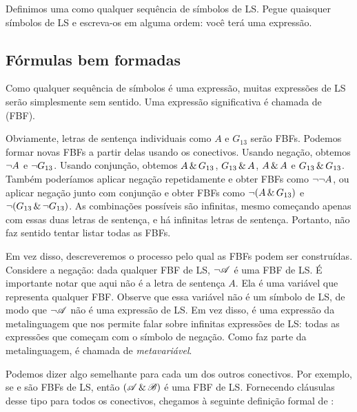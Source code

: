 Definimos uma  como qualquer sequência de símbolos de LS. Pegue quaisquer símbolos de LS e escreva-os em alguma ordem: você terá uma expressão.


\subsection{Fórmulas bem formadas}

Como qualquer sequência de símbolos é uma expressão, muitas expressões de LS serão simplesmente sem sentido. Uma expressão significativa é chamada de  (FBF).

Obviamente, letras de sentença individuais como $A$ e $G_{13}$ serão FBFs. Podemos formar novas FBFs a partir delas usando os conectivos. Usando negação, obtemos $\neg A$ e $\neg G_{13}$. Usando conjunção, obtemos $A \,\&\, G_{13}$, $G_{13} \,\&\, A$, $A \,\&\, A$ e $G_{13} \,\&\, G_{13}$. Também poderíamos aplicar negação repetidamente e obter FBFs como $\neg \neg A$, ou aplicar negação junto com conjunção e obter FBFs como $\neg(A \,\&\, G_{13})$ e $\neg(G_{13} \,\&\, \neg G_{13})$. As combinações possíveis são infinitas, mesmo começando apenas com essas duas letras de sentença, e há infinitas letras de sentença. Portanto, não faz sentido tentar listar todas as FBFs.

Em vez disso, descreveremos o processo pelo qual as FBFs podem ser construídas. Considere a negação: dada qualquer FBF  de LS, $\neg\mathscr{A}$ é uma FBF de LS. É importante notar que  aqui não é a letra de sentença $A$. Ela é uma variável que representa qualquer FBF. Observe que essa variável  não é um símbolo de LS, de modo que $\neg\mathscr{A}$ não é uma expressão de LS. Em vez disso, é uma expressão da metalinguagem que nos permite falar sobre infinitas expressões de LS: todas as expressões que começam com o símbolo de negação. Como  faz parte da metalinguagem, é chamada de \emph{metavariável}.

Podemos dizer algo semelhante para cada um dos outros conectivos. Por exemplo, se  e  são FBFs de LS, então $(\mathscr{A}\,\&\,\mathscr{B})$ é uma FBF de LS. Fornecendo cláusulas desse tipo para todos os conectivos, chegamos à seguinte definição formal de :

